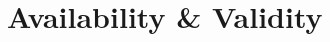 \newcommand{\blobB}{\ensuremath{\bar{B}}} %
\newcommand{\PoVB}{\ensuremath{PoV_B}} %
\newcommand{\paraValidSet}{\ensuremath{\mathcal{V}_\rho}} %


\chapter{Availability \& Validity}










